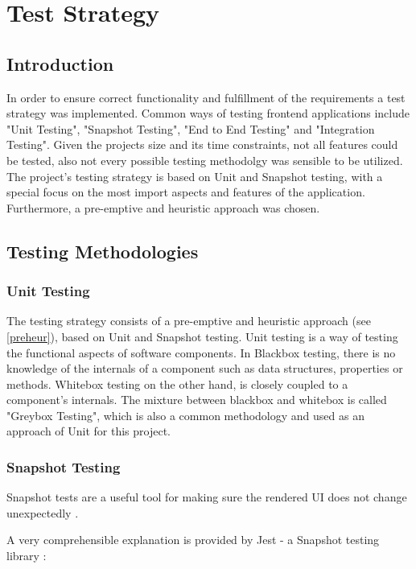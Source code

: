 \chapter[Test Strategy]{Test Strategy}

\section{Introduction}
In order to ensure correct functionality and fulfillment of the requirements a test strategy was implemented. Common ways of testing frontend applications include "Unit Testing", "Snapshot Testing", "End to End Testing" and "Integration Testing". Given the projects size and its time constraints, not all features could be tested, also not every possible testing methodolgy was sensible to be utilized. The project's testing strategy is based on Unit and Snapshot testing, with a special focus on the most import aspects and features of the application. Furthermore, a pre-emptive and heuristic approach was chosen. 

\section{Testing Methodologies}

\subsection{Unit Testing}
The testing strategy consists of a pre-emptive and heuristic approach (see \autoref{preheur}), based on Unit and Snapshot testing.
Unit testing is a way of testing the functional aspects of software components. In Blackbox testing, there is no knowledge of the internals of a component such as data structures, properties or methods. Whitebox testing on the other hand, is closely coupled to a component's internals. The mixture between blackbox and whitebox is called "Greybox Testing", which is also a common methodology \cite{spillner2014software} and used as an approach of Unit for this project.

\subsection{Snapshot Testing}
Snapshot tests are a useful tool for making sure the rendered UI does not change unexpectedly \cite{SnapshotJest:online}.

A very comprehensible explanation is provided by Jest - a Snapshot testing library \cite{SnapshotJest:online}:

